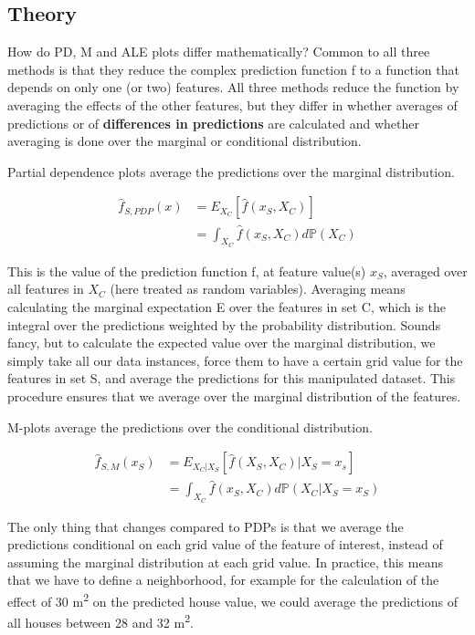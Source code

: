 \documentclass[
  12pt,
]{krantz}
\begin{document}
\hypertarget{theory-2}{%
\subsection{Theory}\label{theory-2}}

How do PD, M and ALE plots differ mathematically?
Common to all three methods is that they reduce the complex prediction function f to a function that depends on only one (or two) features.
All three methods reduce the function by averaging the effects of the other features, but they differ in whether averages of predictions or of \textbf{differences in predictions} are calculated and whether averaging is done over the marginal or conditional distribution.

Partial dependence plots average the predictions over the marginal distribution.

\begin{align*}
\hat{f}_{S,PDP}(x)&=E_{X_C}\left[\hat{f}(x_S,X_C)\right] \\
& = \int_{X_C}\hat{f}(x_S,X_C)d\mathbb{P}(X_C)
\end{align*}

This is the value of the prediction function f, at feature value(s) \(x_S\), averaged over all features in \(X_C\) (here treated as random variables).
Averaging means calculating the marginal expectation E over the features in set C, which is the integral over the predictions weighted by the probability distribution.
Sounds fancy, but to calculate the expected value over the marginal distribution, we simply take all our data instances, force them to have a certain grid value for the features in set S, and average the predictions for this manipulated dataset.
This procedure ensures that we average over the marginal distribution of the features.

M-plots average the predictions over the conditional distribution.

\begin{align*}\hat{f}_{S,M}(x_S)&=E_{X_C|X_S}\left[\hat{f}(X_S,X_C)|X_S=x_s\right]\\&=\int_{X_C}\hat{f}(x_S, X_C)d\mathbb{P}(X_C|X_S = x_S)\end{align*}

The only thing that changes compared to PDPs is that we average the predictions conditional on each grid value of the feature of interest, instead of assuming the marginal distribution at each grid value.
In practice, this means that we have to define a neighborhood, for example for the calculation of the effect of 30 m\textsuperscript{2} on the predicted house value, we could average the predictions of all houses between 28 and 32 m\textsuperscript{2}.
\end{document}
